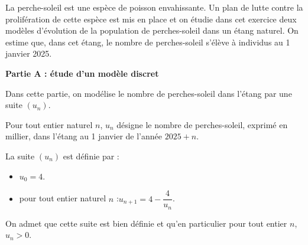 La perche-soleil est une espèce de poisson envahissante. Un plan de lutte contre la prolifération de cette espèce est mis en place et on étudie dans cet exercice deux modèles d'évolution de la population de perches-soleil dans un étang naturel. On estime que, dans cet étang, le nombre de perches-soleil s'élève à  individus au 1 janvier 2025.

\textbf{Partie A : étude d'un modèle discret}

Dans cette partie, on modélise le nombre de perches-soleil dans l'étang par une suite $(u_n)$.

Pour tout entier naturel $n$, $u_{n}$ désigne le nombre de perches-soleil, exprimé en millier, dans l'étang au 1 janvier de l'année $2025+n$.

La suite $(u_n)$ est définie par :

\begin{itemize}
\item $u_{0}=4$.
\item pour tout entier naturel $n$ :\quad $u_{n+1}=4-\dfrac{4}{u_{n}}$.
\end{itemize}

On admet que cette suite est bien définie et qu'en particulier pour tout entier $n$,\quad $u_{n}>0$.

